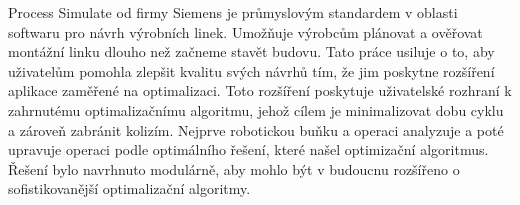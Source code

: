 Process Simulate od firmy Siemens je průmyslovým standardem v oblasti softwaru pro návrh výrobních linek.
Umožňuje výrobcům plánovat a ověřovat montážní linku dlouho než začneme stavět budovu.
Tato práce usiluje o to, aby uživatelům pomohla zlepšit kvalitu svých návrhů tím, že jim poskytne rozšíření aplikace zaměřené na optimalizaci.
Toto rozšíření poskytuje uživatelské rozhraní k zahrnutému optimalizačnímu algoritmu, jehož cílem je minimalizovat dobu cyklu a zároveň zabránit kolizím.
Nejprve robotickou buňku a operaci analyzuje a poté upravuje operaci podle optimálního řešení, které našel optimizační algoritmus.
Řešení bylo navrhnuto modulárně, aby mohlo být v budoucnu rozšířeno o sofistikovanější optimalizační algoritmy.